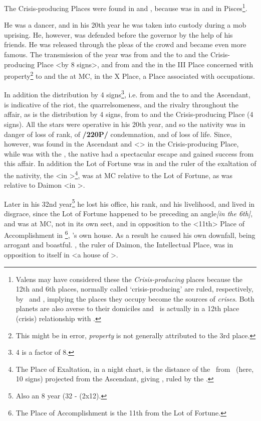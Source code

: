 The Crisis-producing Places were found in \Pisces\xspace and \Scorpio, because \Venus\xspace was in \Scorpio\xspace and \Mars in Pisces\footnote{Valens may have considered these the \textsl{Crisis-producing} places because the 12th and 6th places, normally called `crisis-producing' are ruled, respectively, by \Venus\, and \Mars, implying the places they occupy become the sources of \textsl{crises}. Both planets are also averse to their domiciles and \Mars\, is actually in a 12th place (crisis) relationship with \Aries.}. 

He was a dancer, and in his 20th year he was taken into custody during a mob uprising. He, however, was defended before the governor by the help of his friends. He was released through the pleas of the crowd and became even more famous. The transmission of the year was from \Saturn\xspace and the \Moon\xspace to \Mars\xspace and the Crisis-producing Place <by 8 signs>, and from \Jupiter\xspace and the \Sun\xspace in the III Place concerned with property\footnote{This might be in error, \textsl{property} is not generally attributed to the 3rd place.} to \Saturn\xspace and the \Moon\xspace at MC, in the X Place, a Place associated with occupations. 

In addition the distribution by 4 signs\footnote{4 is a factor of 8.}, i.e. from \Saturn\xspace and the \Moon\xspace to \Venus\xspace and the Ascendant, is indicative of the riot, the quarrelsomeness, and the rivalry throughout the affair, as is the distribution by 4 signs, from \Mercury\xspace to \Mars\xspace and the Crisis-producing Place (4 signs). All the stars were operative in his 20th year, and so the nativity was in danger of loss of rank, of \textbf{/220P/} condemnation, and of loss of life. Since, however, \Venus\xspace was found in the Ascendant and <\Mars> in the Crisis-producing Place, while \Jupiter\xspace was with the \Sun, the native had a spectacular escape and gained
success from this affair. In addition the Lot of Fortune was in \Aries\xspace and the ruler of the exaltation of the nativity, the \Sun <in \Capricorn>\footnote{The Place of Exaltation, in a night chart, is the distance of the \Moon\, from \Taurus\, (here, 10 signs) projected from the Ascendant, giving \Leo, ruled by the \Sun.}, was at MC relative to the Lot of Fortune, as was \Mars\xspace relative to Daimon <in \Gemini>. 

Later in his 32nd year\footnote{Also an 8 year (32 - (2x12).} he lost his office, his rank, and his livelihood, and lived in disgrace, since the Lot of Fortune happened to be preceding an angle\textsl{[in the 6th]}, and \Saturn\xspace was at MC, not in its own sect, and in opposition to the <11th> Place of Accomplishment in \Aquarius\footnote{The Place of Accomplishment is the 11th from the Lot of Fortune.}, \Saturn’s own house. As a result he caused his own downfall, being arrogant and boastful. \Mercury, the ruler of Daimon, the Intellectual Place, was in opposition to itself in \Gemini <a house of \Mercury>.

